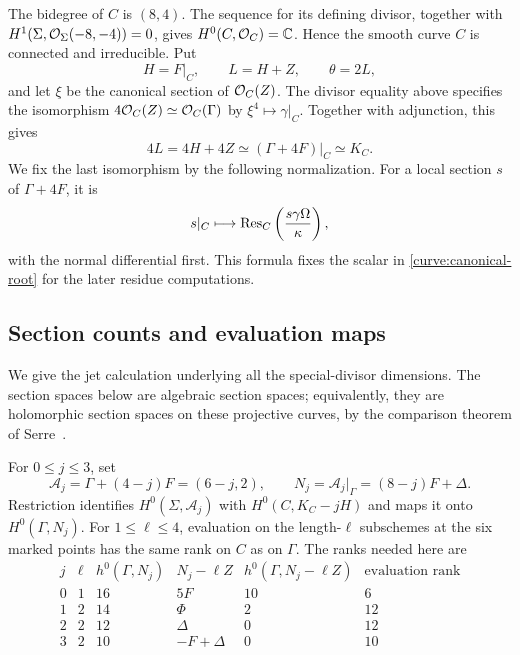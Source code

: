 The bidegree of $C$ is $(8,4)$.  The sequence for its defining divisor,
together with $H^1(\Sigma,\mathcal O_\Sigma(-8,-4))=0$, gives
$H^0(C,\mathcal O_C)=\mathbb C$.  Hence the smooth curve $C$ is connected and
irreducible.  Put
\begin{equation}\label{curve:line-bundles}
 H=F|_C,\qquad L=H+Z,\qquad\theta=2L,
\end{equation}
and let $\xi$ be the canonical section of $\mathcal O_C(Z)$.
The divisor equality above specifies the isomorphism
$4\mathcal O_C(Z)\simeq\mathcal O_C(\Gamma)$ by $\xi^4\mapsto\gamma|_C$.
Together with adjunction, this gives
\begin{equation}\label{curve:canonical-root}
 4L=4H+4Z\simeq(\Gamma+4F)|_C\simeq K_C.
\end{equation}
We fix the last isomorphism by the following normalization.  For a
local section $s$ of $\Gamma+4F$, it is
\begin{equation}\label{curve:adjunction-normalization}
 s|_C\longmapsto
 \operatorname{Res}_C\left(\frac{s\gamma\Omega}{\kappa}\right),
\end{equation}
with the normal differential first.  This formula fixes the scalar in
\eqref{curve:canonical-root} for the later residue computations.

\subsection{Section counts and evaluation maps}

We give the jet calculation underlying all the special-divisor
dimensions.  The section spaces below are algebraic section spaces;
equivalently, they are holomorphic section spaces on these projective
curves, by the comparison theorem of Serre~\cite[Theorem~1]{SerreGAGA1956}.

\begin{lemma}\label{curve:adjoint-jets}
For $0\le j\le3$, set
\[
 \mathcal A_j=\Gamma+(4-j)F=(6-j,2),\qquad
 N_j=\mathcal A_j|_\Gamma=(8-j)F+\Delta.
\]
Restriction identifies $H^0(\Sigma,\mathcal A_j)$ with
$H^0(C,K_C-jH)$ and maps it onto $H^0(\Gamma,N_j)$.
For $1\le\ell\le4$, evaluation on the length-$\ell$ subschemes at
the six marked points has the same rank on $C$ as on $\Gamma$.
The ranks needed here are
\begin{equation}\label{curve:residual-table}
\begin{array}{c|c|c|c|c|c}
 j&\ell& h^0(\Gamma,N_j)&N_j-\ell Z
   &h^0(\Gamma,N_j-\ell Z)&\text{evaluation rank}\\ \hline
 0&1&16&5F&10&6\\
 1&2&14&\Phi&2&12\\
 2&2&12&\Delta&0&12\\
 3&2&10&-F+\Delta&0&10
\end{array}
\end{equation}
\end{lemma}

